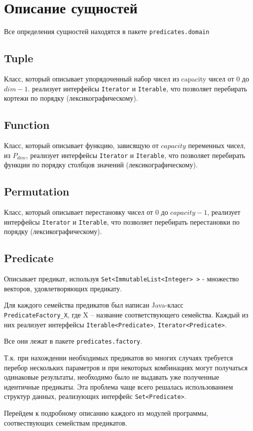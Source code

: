 \documentclass[a4paper,14pt]{extreport}
\begin{document}
\section{Описание сущностей}
Все определения сущностей находятся в пакете {\tt predicates.domain}
\subsection{Tuple}
Класс, который описывает упорядоченный набор чисел из capacity чисел от $0$ до $dim-1$. реализует интерфейсы {\tt Iterator} и {\tt Iterable}, что позволяет перебирать кортежи по порядку (лексикографическому).
\subsection{Function}
Класс, который описывает функцию, зависящую от $capacity$ переменных чисел, из $P_{dim}$, реализует интерфейсы {\tt Iterator} и {\tt Iterable}, что позволяет перебирать функции по порядку столбцов значений (лексикографическому).
\subsection{Permutation}
Класс, который описывает перестановку чисел от $0$ до $capacity-1$, реализует интерфейсы {\tt Iterator} и {\tt Iterable}, что позволяет перебирать перестановки по порядку (лексикографическому).
\subsection{Predicate} 
Описывает предикат, используя {\tt Set<ImmutableList<Integer> >} - множество векторов, удовлетворяющих предикату.

Для каждого семейства предикатов был написан Java-класс \\{\tt PredicateFactory\_X}, где X – название соответствующего семейства. Каждый из них реализует интерфейсы {\tt Iterable<Predicate>}, {\tt Iterator<Predicate>}.

Все они лежат в пакете {\tt predicates.factory}.

Т.к. при нахождении необходимых предикатов во многих случаях требуется перебор нескольких параметров и при некоторых комбинациях могут получаться  одинаковые результаты, необходимо было не выдавать уже полученные идентичные предикаты. Эта  проблема чаще всего решалась использованием структур данных, реализующих интерфейс {\tt Set<Predicate>}. 

Перейдем к подробному описанию каждого из модулей программы, соотвествующих семействам предикатов.
\end{document}
